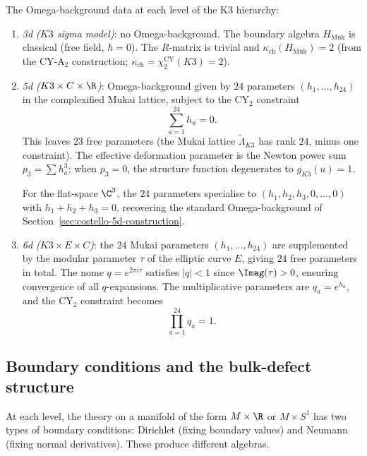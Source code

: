 \begin{construction}
\label{constr:k3-omega-hierarchy}
The Omega-background data at each level of the K3 hierarchy:
\begin{enumerate}[label=\textup{(\roman*)}]
 \item \emph{3d ($K3$ sigma model)}: no Omega-background. The boundary algebra $H_{\mathrm{Muk}}$ is classical (free field, $\hbar = 0$). The $R$-matrix is trivial and $\kappa_{\mathrm{ch}}(H_{\mathrm{Muk}}) = 2$ (from the CY-A$_2$ construction; $\kappa_{\mathrm{ch}} = \chi^{\mathrm{CY}}_2(K3) = 2$).

 \item \emph{5d ($K3 \times C \times \R$)}: Omega-background given by $24$ parameters $(h_1, \ldots, h_{24})$ in the complexified Mukai lattice, subject to the CY$_2$ constraint
 \[
 \sum_{a=1}^{24} h_a = 0.
 \]
 This leaves $23$ free parameters (the Mukai lattice $\widetilde{\Lambda}_{K3}$ has rank $24$, minus one constraint). The effective deformation parameter is the Newton power sum $p_3 = \sum h_a^3$; when $p_3 = 0$, the structure function degenerates to $g_{K3}(u) = 1$.

 For the flat-space $\C^3$, the $24$ parameters specialise to $(h_1, h_2, h_3, 0, \ldots, 0)$ with $h_1 + h_2 + h_3 = 0$, recovering the standard Omega-background of Section~\ref{sec:costello-5d-construction}.

 \item \emph{6d ($K3 \times E \times C$)}: the $24$ Mukai parameters $(h_1, \ldots, h_{24})$ are supplemented by the modular parameter $\tau$ of the elliptic curve $E$, giving $24$ free parameters in total. The nome $q = e^{2\pi i \tau}$ satisfies $|q| < 1$ since $\Imag(\tau) > 0$, ensuring convergence of all $q$-expansions. The multiplicative parameters are $q_a = e^{h_a}$, and the CY$_2$ constraint becomes
 \[
 \prod_{a=1}^{24} q_a = 1.
 \]
\end{enumerate}
\end{construction}

\subsection{Boundary conditions and the bulk-defect structure}
\label{subsec:k3-boundary-defect}

At each level, the theory on a manifold of the form $M \times \R$ or $M \times S^1$ has two types of boundary conditions: Dirichlet (fixing boundary values) and Neumann (fixing normal derivatives). These produce different algebras.

